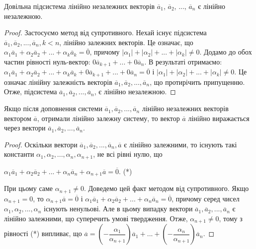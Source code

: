 \begin{claim}
	Довільна підсистема лінійно незалежних векторів $\overline{a}_1$, $\overline{a}_2$, $...$, $\overline{a}_n$ є лінійно
	незалежною.
\end{claim}
\begin{proof}
	Застосуємо метод від супротивного. Нехай існує підсистема
	$\overline{a}_1, \overline{a}_2, ..., \overline{a}_n, k<n$, лінійно залежних векторів. Це означає, що
	$\alpha_1\overline{a}_1 + \alpha_2\overline{a}_2 + ... + \alpha_{k}\overline{a}_{k} = \overline{0}$, причому $|\alpha_1| + |\alpha_2| + ... + |\alpha_k| \neq 0$. Додамо до обох
	частин рівності нуль-вектор: $0\overline{a}_{k+1} + ... + 0\overline{a}_{n}$. В результаті отримаємо:
	$\alpha_1\overline{a}_1 + \alpha_2\overline{a}_2 + ... + \alpha_k\overline{a}_k + 0\overline{a}_{k+1} + ... + 0\overline{a}_{n} = \overline{0}$ і $|\alpha_1| + |\alpha_2| + ... + |\alpha_k| \neq 0$.
	Це означає лінійну залежність векторів $\overline{a}_1, \overline{a}_2, ..., \overline{a}_n$, що протирічить припущенню.
	Отже, підсистема $\overline{a}_1, \overline{a}_2, ..., \overline{a}_n$, є лінійно незалежною. 
\end{proof}

\begin{claim}
	Якщо після доповнення системи $\overline{a}_1, \overline{a}_2, ..., \overline{a}_n$ лінійно незалежних
	векторів вектором $\overline{a}$, отримали лінійно залежну систему, то вектор $\overline{a}$ лінійно
	виражається через вектори $\overline{a}_1, \overline{a}_2, ..., \overline{a}_n$.
\end{claim}
\begin{proof}
	Оскільки вектори $\overline{a}_1, \overline{a}_2, ..., \overline{a}_n, \overline{a}$ є лінійно залежними, то існують
	такі константи $\alpha_1, \alpha_2, ..., \alpha_n, \alpha_{n+1}$, не всі рівні нулю, що
	
	$\alpha_1\overline{a}_1 + \alpha_2\overline{a}_2 + ... + \alpha_n\overline{a}_n + \alpha_{n+1}\overline{a} = \overline{0}$. (*)
	
	При цьому саме $\alpha_{n+1} \neq 0$. Доведемо цей факт методом від супротивного. Якщо
	$\alpha_{n+1} = 0$, то $\alpha_{n+1}\overline{a} = \overline{0}$ і $\alpha_1\overline{a}_1 + \alpha_2\overline{a}_2 + ... + \alpha_n\overline{a}_n = \overline{0}$, причому серед чисел
	$\alpha_1, \alpha_2, ..., \alpha_n$ існують ненульові. Але в цьому випадку вектори $\overline{a}_1, \overline{a}_2, ..., \overline{a}_n$ є 
	лінійно залежними, що суперечить умові твердження. Отже, $\alpha_{n+1} \neq 0$, тому з
	рівності (*) випливає, що $\overline{a} = \left(-\dfrac{\alpha_1}{\alpha_{n+1}}\right)\overline{a}_1 + ... + \left(-\dfrac{\alpha_n}{\alpha_{n+1}}\right)\overline{a}_n$.
\end{proof}

